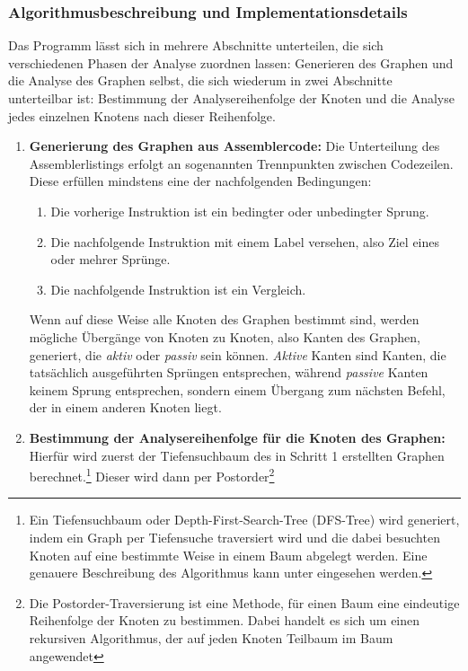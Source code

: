 \documentclass[11pt]{article} %
\begin{document}
\subsubsection{Algorithmusbeschreibung und Implementationsdetails} Das Programm lässt sich in
mehrere Abschnitte unterteilen, die sich verschiedenen Phasen der Analyse zuordnen lassen:
Generieren des Graphen und die Analyse des Graphen selbst, die sich wiederum in zwei Abschnitte
unterteilbar ist: Bestimmung der Analysereihenfolge der Knoten und die Analyse jedes einzelnen
Knotens nach dieser Reihenfolge.
\begin{enumerate}
	\item{\textbf{Generierung des Graphen aus Assemblercode:}}
		Die Unterteilung des Assemblerlistings erfolgt an sogenannten Trennpunkten
		zwischen Codezeilen.
		Diese erfüllen mindstens eine der nachfolgenden Bedingungen:
		\begin{enumerate}
			\item{Die vorherige Instruktion ist ein bedingter oder unbedingter Sprung.}
			\item{Die nachfolgende Instruktion mit einem Label versehen,
				also Ziel eines oder mehrer Sprünge.}
			\item{Die nachfolgende Instruktion ist ein Vergleich.}
		\end{enumerate}
		Wenn auf diese Weise alle Knoten des Graphen bestimmt sind, werden mögliche Übergänge von
		Knoten zu Knoten, also Kanten des Graphen, generiert, die \textit{aktiv} oder
		\textit{passiv} sein können. \textit{Aktive} Kanten sind Kanten, die
		tatsächlich ausgeführten Sprüngen entsprechen, während \textit{passive}
		Kanten keinem Sprung entsprechen, sondern einem Übergang zum nächsten Befehl,
		der in einem anderen Knoten liegt.
	\item{\textbf{Bestimmung der Analysereihenfolge für die Knoten des Graphen:}} Hierfür wird
		zuerst der Tiefensuchbaum des in Schritt 1 erstellten Graphen berechnet.\footnote{
			Ein Tiefensuchbaum oder Depth-First-Search-Tree (DFS-Tree) wird generiert,
			indem ein Graph per Tiefensuche traversiert wird und die dabei besuchten
			Knoten auf eine bestimmte Weise in einem  Baum abgelegt werden. Eine genauere
			Beschreibung des Algorithmus kann unter \cite{wiki2:5} eingesehen werden.
		}
		Dieser wird dann per Postorder\footnote{
			Die Postorder-Traversierung ist eine Methode, für einen Baum eine eindeutige
			Reihenfolge der Knoten zu bestimmen. Dabei handelt es sich um einen
			rekursiven Algorithmus, der auf jeden Knoten Teilbaum im Baum angewendet
}
\end{enumerate}
\end{document}
